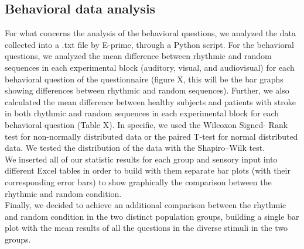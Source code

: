 \subsection{Behavioral data analysis}
For what concerns the analysis of the behavioral questions, we analyzed the data collected into a .txt file by E-prime, through a Python script. For the behavioral questions, we analyzed the mean difference between rhythmic and random sequences in each experimental block (auditory, visual, and audiovisual) for each behavioral question of the questionnaire (figure X, this will be the bar graphs showing differences between rhythmic and random sequences). Further, we also calculated the mean difference between healthy subjects and patients with stroke in both rhythmic and random sequences in each experimental block for each behavioral question (Table X). In specific, we used the Wilcoxon Signed- Rank test for non-normally distributed data or the paired T-test for normal distributed data. We tested the distribution of the data with the Shapiro–Wilk test.\\
We inserted all of our statistic results for each group and sensory input into different Excel tables in order to build with them separate bar plots (with their corresponding error bars) to show graphically the comparison between the rhythmic and random condition. \\
Finally, we decided to achieve an additional comparison between the rhythmic and random condition in the two distinct population groups, building a single bar plot with the mean results of all the questions in the diverse stimuli in the two groups. 

